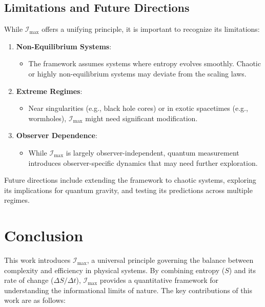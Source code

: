 \documentclass[12pt]{article}
\begin{document}
\subsection{Limitations and Future Directions}
While \( \mathcal{I}_{\text{max}} \) offers a unifying principle, it is important to recognize its limitations:
\begin{enumerate}
    \item \textbf{Non-Equilibrium Systems}:
    \begin{itemize}
        \item The framework assumes systems where entropy evolves smoothly. Chaotic or highly non-equilibrium systems may deviate from the scaling laws.
    \end{itemize}
    \item \textbf{Extreme Regimes}:
    \begin{itemize}
        \item Near singularities (e.g., black hole cores) or in exotic spacetimes (e.g., wormholes), \( \mathcal{I}_{\text{max}} \) might need significant modification.
    \end{itemize}
    \item \textbf{Observer Dependence}:
    \begin{itemize}
        \item While \( \mathcal{I}_{\text{max}} \) is largely observer-independent, quantum measurement introduces observer-specific dynamics that may need further exploration.
    \end{itemize}
\end{enumerate}

Future directions include extending the framework to chaotic systems, exploring its implications for quantum gravity, and testing its predictions across multiple regimes.


\section{Conclusion}
This work introduces \( \mathcal{I}_{\text{max}} \), a universal principle governing the balance between complexity and efficiency in physical systems. By combining entropy (\( S \)) and its rate of change (\( \Delta S / \Delta t \)), \( \mathcal{I}_{\text{max}} \) provides a quantitative framework for understanding the informational limits of nature. The key contributions of this work are as follows:
\end{document}
